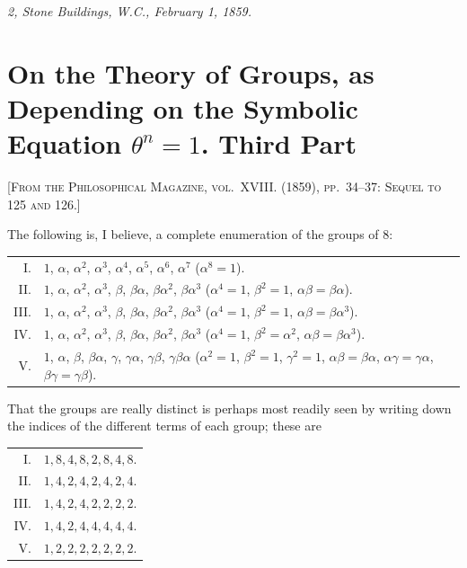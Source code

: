 \documentclass[11pt,a4paper]{article}
\begin{document}
\medskip
\noindent\textit{2, Stone Buildings, W.C., February 1, 1859.}

\newpage


\section{On the Theory of Groups, as Depending on the Symbolic Equation $\theta^{n} = 1$. Third Part}
\label{paper:243}

\textsc{[From the Philosophical Magazine, vol.~XVIII. (1859), pp.~34--37: Sequel to 125 and 126.]}

\setcounter{page}{88}

The following is, I believe, a complete enumeration of the groups of 8:
\begin{center}
\begin{tabular}{rl}
I.   & $1$, $\alpha$, $\alpha^{2}$, $\alpha^{3}$, $\alpha^{4}$, $\alpha^{5}$, $\alpha^{6}$, $\alpha^{7}$ \quad ($\alpha^{8} = 1$). \\
II.  & $1$, $\alpha$, $\alpha^{2}$, $\alpha^{3}$, $\beta$, $\beta\alpha$, $\beta\alpha^{2}$, $\beta\alpha^{3}$ \quad ($\alpha^{4} = 1$, $\beta^{2} = 1$, $\alpha\beta = \beta\alpha$). \\
III. & $1$, $\alpha$, $\alpha^{2}$, $\alpha^{3}$, $\beta$, $\beta\alpha$, $\beta\alpha^{2}$, $\beta\alpha^{3}$ \quad ($\alpha^{4} = 1$, $\beta^{2} = 1$, $\alpha\beta = \beta\alpha^{3}$). \\
IV.  & $1$, $\alpha$, $\alpha^{2}$, $\alpha^{3}$, $\beta$, $\beta\alpha$, $\beta\alpha^{2}$, $\beta\alpha^{3}$ \quad ($\alpha^{4} = 1$, $\beta^{2} = \alpha^{2}$, $\alpha\beta = \beta\alpha^{3}$). \\
V.   & $1$, $\alpha$, $\beta$, $\beta\alpha$, $\gamma$, $\gamma\alpha$, $\gamma\beta$, $\gamma\beta\alpha$ \quad ($\alpha^{2} = 1$, $\beta^{2} = 1$, $\gamma^{2} = 1$, $\alpha\beta = \beta\alpha$, $\alpha\gamma = \gamma\alpha$, $\beta\gamma = \gamma\beta$).
\end{tabular}
\end{center}

That the groups are really distinct is perhaps most readily seen by writing down the indices of the different terms of each group; these are
\begin{center}
\begin{tabular}{rl}
I.   & $1, 8, 4, 8, 2, 8, 4, 8$. \\
II.  & $1, 4, 2, 4, 2, 4, 2, 4$. \\
III. & $1, 4, 2, 4, 2, 2, 2, 2$. \\
IV.  & $1, 4, 2, 4, 4, 4, 4, 4$. \\
V.   & $1, 2, 2, 2, 2, 2, 2, 2$.
\end{tabular}
\end{center}
\end{document}
